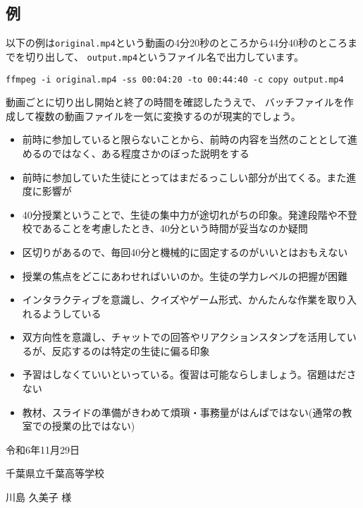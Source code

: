 \documentclass[12pt,jafontscale=0.9247]{jlreq}
\begin{document}
\subsection{例}

以下の例は\verb|original.mp4|という動画の4分20秒のところから44分40秒のところまでを切り出して、
\verb|output.mp4|というファイル名で出力しています。


\begin{tcolorbox}\small
\verb|ffmpeg -i original.mp4 -ss 00:04:20 -to 00:44:40 -c copy output.mp4|
\end{tcolorbox}

動画ごとに切り出し開始と終了の時間を確認したうえで、
バッチファイルを作成して複数の動画ファイルを一気に変換するのが現実的でしょう。

\newpage
\begin{itemize}
 \item 前時に参加していると限らないことから、前時の内容を当然のこととして進めるのではなく、ある程度さかのぼった説明をする
 \item 前時に参加していた生徒にとってはまだるっこしい部分が出てくる。また進度に影響が
 \item 40分授業ということで、生徒の集中力が途切れがちの印象。発達段階や不登校であることを考慮したとき、40分という時間が妥当なのか疑問
 \item 区切りがあるので、毎回40分と機械的に固定するのがいいとはおもえない
 \item 授業の焦点をどこにあわせればいいのか。生徒の学力レベルの把握が困難
 \item インタラクティブを意識し、クイズやゲーム形式、かんたんな作業を取り入れるようしている
 \item 双方向性を意識し、チャットでの回答やリアクションスタンプを活用しているが、反応するのは特定の生徒に偏る印象
 \item 予習はしなくていいといっている。復習は可能ならしましょう。宿題はださない
 \item 教材、スライドの準備がきわめて煩瑣・事務量がはんぱではない(通常の教室での授業の比ではない)
\end{itemize}


\newpage
\begin{flushright}
令和6年11月29日 
\end{flushright}

\bigskip

千葉県立千葉高等学校

 川島 久美子 様
\end{document}

